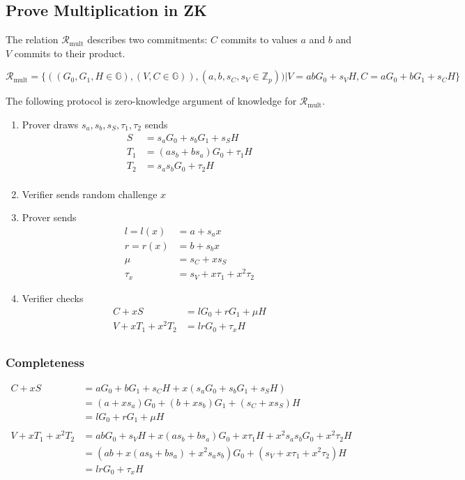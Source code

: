 \subsection{Prove Multiplication in ZK}
The relation $\mathcal{R}_{\textrm{mult}}$ describes two commitments: $C$ commits to values $a$ and $b$ and $V$ commits to their product.

\begin{equation*}
  \mathcal{R}_{\textrm{mult}} = \{ ((G_0, G_1, H \in \mathbb{G}), (V, C \in \mathbb{G})) , (a, b, s_C, s_V \in \mathbb{Z}_p))  | V = abG_0 + s_VH, C = aG_0 + bG_1 + s_CH\}
\end{equation*}

The following protocol is zero-knowledge argument of knowledge for $\mathcal{R}_{\textrm{mult}}$.

\begin{enumerate}
\item Prover draws $s_a, s_b, s_S, \tau_1, \tau_2$ sends
  \begin{align*}
    S &= s_aG_0 + s_b G_1 + s_S H\\
    T_1 &= (as_b + bs_a)G_0 + \tau_1H\\
    T_2 &= s_as_bG_0 + \tau_2H\\
  \end{align*}
  \item Verifier sends random challenge $x$
  \item Prover sends
  \begin{align*}
    l = l(x) &= a + s_ax\\
    r = r(x) &= b + s_bx\\
    \mu &= s_C + xs_S\\
    \tau_x &= s_V + x\tau_1 + x^2\tau_2
  \end{align*}
  \item Verifier checks
    \begin{align*}
      C + xS &= lG_0 + rG_1 + \mu H\\
      V + xT_1 + x^2T_2 &= lrG_0 + \tau_x H \\
    \end{align*}
\end{enumerate}

\subsubsection{Completeness}
\begin{align*}
  C + xS &= aG_0 + bG_1 + s_CH + x(s_aG_0 + s_b G_1 + s_SH)\\
         &= (a + xs_a)G_0 + (b + xs_b)G_1 + (s_C + xs_S)H\\
         &= lG_0 + rG_1 + \mu H\\
  \\
  V + xT_1 + x^2T_2 &= abG_0 + s_VH+ x(as_b + bs_a)G_0 + x\tau_1H + x^2s_as_bG_0 + x^2\tau_2H\\
                    &= (ab + x(as_b + bs_a) + x^2s_as_b)G_0 + (s_V + x\tau_1 + x^2\tau_2)H\\
                    &= lrG_0 + \tau_xH
\end{align*}

